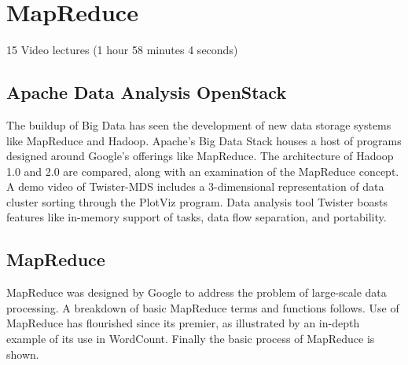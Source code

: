 \chapter{MapReduce}
\label{sec:icloud-mapreduce}

\FILENAME

15 Video lectures (1 hour 58 minutes 4 seconds)

\section{Apache Data Analysis OpenStack}

The buildup of Big Data has seen the development of new data storage
systems like MapReduce and Hadoop. Apache's Big Data Stack houses a host
of programs designed around Google's offerings like MapReduce. The
architecture of Hadoop 1.0 and 2.0 are compared, along with an
examination of the MapReduce concept. A demo video of Twister-MDS
includes a 3-dimensional representation of data cluster sorting through
the PlotViz program. Data analysis tool Twister boasts features like
in-memory support of tasks, data flow separation, and portability.




\section{MapReduce}

MapReduce was designed by Google to address the problem of large-scale
data processing. A breakdown of basic MapReduce terms and functions
follows. Use of MapReduce has flourished since its premier, as
illustrated by an in-depth example of its use in WordCount. Finally the
basic process of MapReduce is shown.




